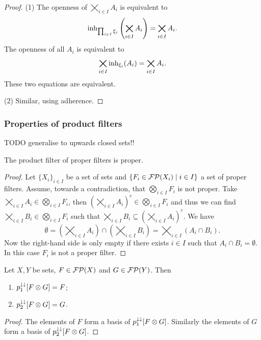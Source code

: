 \begin{proof}
(1) The openness of $\bigtimes_{i\in I}A_i$ is equivalent to 
\[\operatorname{inh}_{\prod_{i\in I}\xi_i}\left(\bigtimes_{i\in I}A_i\right) = \bigtimes_{i\in I}A_i. \]
The openness of all $A_i$ is equivalent to
\[\bigtimes_{i\in I}\operatorname{inh}_{\xi_i}(A_i) = \bigtimes_{i\in I}A_i. \]
These two equations are equivalent.

(2) Similar, using adherence.
\end{proof}

\subsubsection{Properties of product filters}
TODO generalise to upwards closed sets!!

\begin{lemma}
The product filter of proper filters is proper.
\end{lemma}
\begin{proof}
Let $\{X_i\}_{i\in I}$ be a set of sets and $\setbuilder{F_i \in \powerfilters(X_i)}{i\in I}$ a set of proper filters. Assume, towards a contradiction, that $\bigotimes_{i\in I}F_i$ is not proper. Take $\bigtimes_{i\in I}A_i\in \bigotimes_{i\in I}F_i$, then $\left(\bigtimes_{i\in I}A_i\right)^c \in \bigotimes_{i\in I}F_i$ and thus we can find $\bigtimes_{i\in I}B_i\in \bigotimes_{i\in I}F_i$ such that $\bigtimes_{i\in I}B_i \subseteq \left(\bigtimes_{i\in I}A_i\right)^c$. We have
\[ \emptyset = \left(\bigtimes_{i\in I}A_i\right) \cap \left(\bigtimes_{i\in I}B_i\right) = \bigtimes_{i\in I}(A_i\cap B_i). \]
Now the right-hand side is only empty if there exists $i\in I$ such that $A_i\cap B_i = \emptyset$. In this case $F_i$ is not a proper filter.
\end{proof}

\begin{lemma} \label{projectionsOfProductFilter}
Let $X,Y$ be sets, $F\in \operatorname{\mathcal{FP}}(X)$ and $G\in \operatorname{\mathcal{FP}}(Y)$. Then
\begin{enumerate}
\item $p_1^{\downarrow\downarrow}[F\otimes G] = F$;
\item $p_2^{\downarrow\downarrow}[F\otimes G] = G$.
\end{enumerate}
\end{lemma}
\begin{proof}
The elements of $F$ form a basis of $p_1^{\downarrow\downarrow}[F\otimes G]$. Similarly the elements of $G$ form a basis of $p_2^{\downarrow\downarrow}[F\otimes G]$.
\end{proof}

